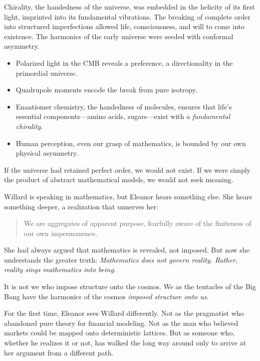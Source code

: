 Chirality, the handedness of the universe, was embedded in the helicity of its first light, imprinted into its fundamental vibrations. The breaking of complete order into structured imperfections allowed life, consciousness, and will to come into existence. The harmonics of the early universe were seeded with conformal asymmetry.

\begin{itemize}
    \item Polarized light in the CMB reveals a preference, a directionality in the primordial universe.
    \item Quadrupole moments encode the break from pure isotropy.
    \item Enantiomer chemistry, the handedness of molecules, ensures that life’s essential components—amino acids, sugars—exist with a \textit{fundamental chirality}.
    \item Human perception, even our grasp of mathematics, is bounded by our own physical asymmetry.
\end{itemize}

If the universe had retained perfect order, we would not exist.  
If we were simply the product of abstract mathematical models, we would not seek meaning.  

\midskip


Willard is speaking in mathematics, but Eleanor hears something else. She hears something deeper, a realization that unnerves her:

\begin{quote}
We are aggregates of apparent purpose,  
fearfully aware of the finiteness of our own impermanence.
\end{quote}

She had always argued that mathematics is revealed, not imposed. But now she understands the greater truth: \textit{Mathematics does not govern reality.  Rather, reality sings mathematics into being.}

It is not we who impose structure onto the cosmos. We as the tentacles of the Big Bang have the harmonics of the cosmos \textit{imposed structure onto us}.

\smallskip

For the first time, Eleanor sees Willard differently.  Not as the pragmatist who abandoned pure theory for financial modeling. Not as the man who believed markets could be mapped onto deterministic lattices. But as someone who, whether he realizes it or not, has walked the long way around only to arrive at her argument from a different path.  

